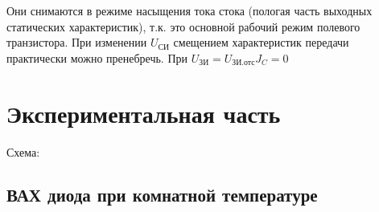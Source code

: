 Они снимаются в режиме насыщения тока стока (пологая часть выходных статических характеристик), т.к. это основной рабочий режим полевого транзистора. При изменении $U_\text{СИ}$ смещением характеристик передачи практически можно пренебречь. При $U_\text{ЗИ} = U_\text{ЗИ.отс} J_C=0$

\section{Экспериментальная часть}
Схема:


\subsection{ВАХ диода при комнатной температуре}




